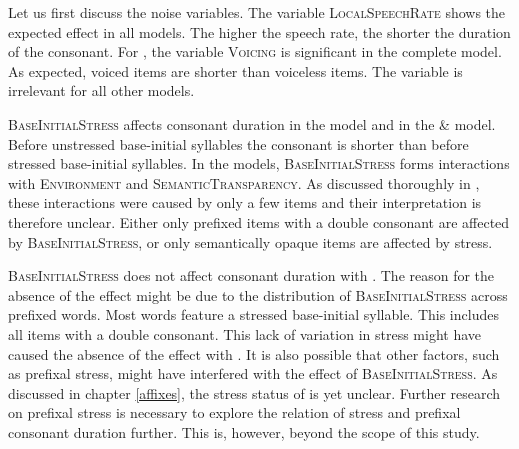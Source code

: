 Let us first discuss the noise variables. The variable \textsc{LocalSpeechRate} shows the expected effect in all models.  The higher the speech rate, the shorter the duration of the consonant. 
For , the variable \textsc{Voicing} is significant in the complete model. As expected, voiced items are shorter than voiceless items. The variable is irrelevant for all other models.

\textsc{BaseInitialStress} affects consonant duration in the model and in the  \&  model. Before unstressed base-initial syllables the consonant is shorter than before stressed base-initial syllables. 
In the models, \textsc{BaseInitialStress} forms interactions with \textsc{Environment} and \textsc{SemanticTransparency}. As discussed thoroughly in , these interactions were caused by only a few items and their interpretation is therefore unclear. Either only prefixed items with a double consonant are affected by \textsc{BaseInitialStress}, or only semantically opaque items are affected by stress.

 \textsc{BaseInitialStress} does not affect consonant duration with . The reason for the absence of the effect might be due to the distribution of \textsc{BaseInitialStress} across prefixed words. Most words feature a stressed base-initial syllable. This includes all items with a double consonant. This lack of variation in stress might have caused the absence of the effect with . It is also possible that other factors, such as prefixal stress, might have interfered with the effect of \textsc{BaseInitialStress}. As discussed in chapter \ref{affixes}, the stress status of  is yet unclear. Further research on prefixal stress is necessary to explore the relation of stress and prefixal consonant duration further. This is, however, beyond the scope of this study.

